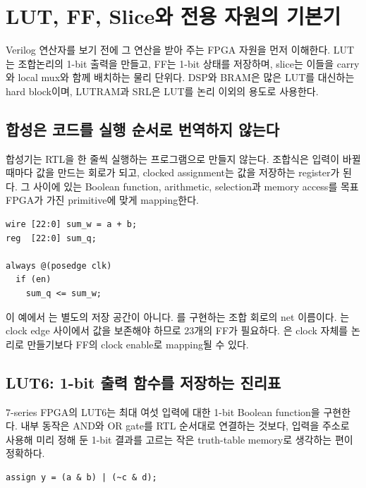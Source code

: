 \chapter{LUT, FF, Slice와 전용 자원의 기본기}

\begin{summarybox}[이 장의 목표]
Verilog 연산자를 보기 전에 그 연산을 받아 주는 FPGA 자원을 먼저 이해한다.
LUT는 조합논리의 1-bit 출력을 만들고, FF는 1-bit 상태를 저장하며, slice는
이들을 carry와 local mux와 함께 배치하는 물리 단위다. DSP와 BRAM은 많은
LUT를 대신하는 hard block이며, LUTRAM과 SRL은 LUT를 논리 이외의 용도로
사용한다.
\end{summarybox}

\section{합성은 코드를 실행 순서로 번역하지 않는다}

합성기는 RTL을 한 줄씩 실행하는 프로그램으로 만들지 않는다. 조합식은 입력이
바뀔 때마다 값을 만드는 회로가 되고, clocked assignment는 값을 저장하는
register가 된다. 그 사이에 있는 Boolean function, arithmetic, selection과
memory access를 목표 FPGA가 가진 primitive에 맞게 mapping한다.

\begin{lstlisting}
wire [22:0] sum_w = a + b;
reg  [22:0] sum_q;

always @(posedge clk)
  if (en)
    sum_q <= sum_w;
\end{lstlisting}

이 예에서 는 별도의 저장 공간이 아니다. 를
구현하는 조합 회로의 net 이름이다. 는 clock edge 사이에서
값을 보존해야 하므로 23개의 FF가 필요하다. 은 clock 자체를
논리로 만들기보다 FF의 clock enable로 mapping될 수 있다.

\section{LUT6: 1-bit 출력 함수를 저장하는 진리표}

7-series FPGA의 LUT6는 최대 여섯 입력에 대한 1-bit Boolean function을
구현한다. 내부 동작은 AND와 OR gate를 RTL 순서대로 연결하는 것보다, 입력을
주소로 사용해 미리 정해 둔 1-bit 결과를 고르는 작은 truth-table memory로
생각하는 편이 정확하다.

\begin{lstlisting}
assign y = (a & b) | (~c & d);
\end{lstlisting}

